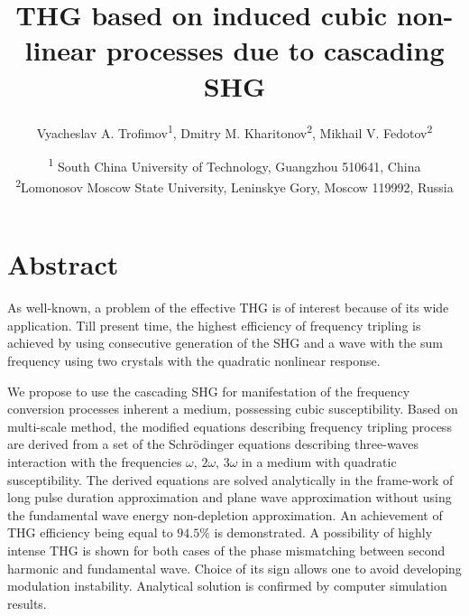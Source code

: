 \documentclass[a4paper, 12pt, onecolumn]{extarticle}
\begin{document}
\newtheorem{theorem}{Theorem}
\author{Vyacheslav A. Trofimov\textsuperscript{1}, Dmitry M. Kharitonov\textsuperscript{2}, Mikhail V. Fedotov\textsuperscript{2}}
\title{THG based on induced cubic non-linear processes  due to cascading SHG}

\date{\textsuperscript{1} South China University of Technology, Guangzhou 510641, China\\
\textsuperscript{2}Lomonosov Moscow State University, Leninskye Gory, Moscow 119992, Russia}
\maketitle
\section*{Abstract}

As well-known, a problem of the effective THG is of interest because of its wide application. Till present time, the highest efficiency of frequency tripling is achieved by using  consecutive generation of  the SHG and a wave with the sum frequency using two crystals with the quadratic nonlinear response. 

We propose to use the cascading SHG for manifestation of the frequency conversion processes inherent a medium, possessing cubic susceptibility. Based on multi-scale method, the modified equations describing frequency tripling process are derived from a set of the  Schr\"{o}dinger equations describing three-waves interaction with the frequencies  \(\omega,\,2\omega,\,3\omega\) in a medium with quadratic susceptibility.  The derived equations are solved analytically in the frame-work of long pulse  duration approximation and plane wave approximation without using the fundamental wave energy non-depletion approximation. An achievement of THG efficiency being equal to $94.5\%$ is demonstrated. A possibility of highly intense THG is shown for both cases of the phase mismatching between second harmonic and fundamental wave. Choice of its sign allows one to avoid developing modulation instability. Analytical solution is confirmed by computer simulation results.
\end{document}
